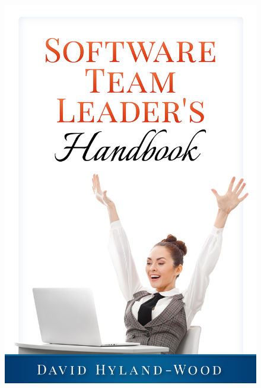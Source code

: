 \documentclass[12pt]{book} %
\begin{document}
\begin{titlepage}

\begin{figure}[htbp]
\begin{center}
\includegraphics[width=1.00\textwidth]{front-back-matter/cover/STLH-DHW-front}
\end{center}
\end{figure}


\end{titlepage}

\pagestyle{empty}
\end{document}
